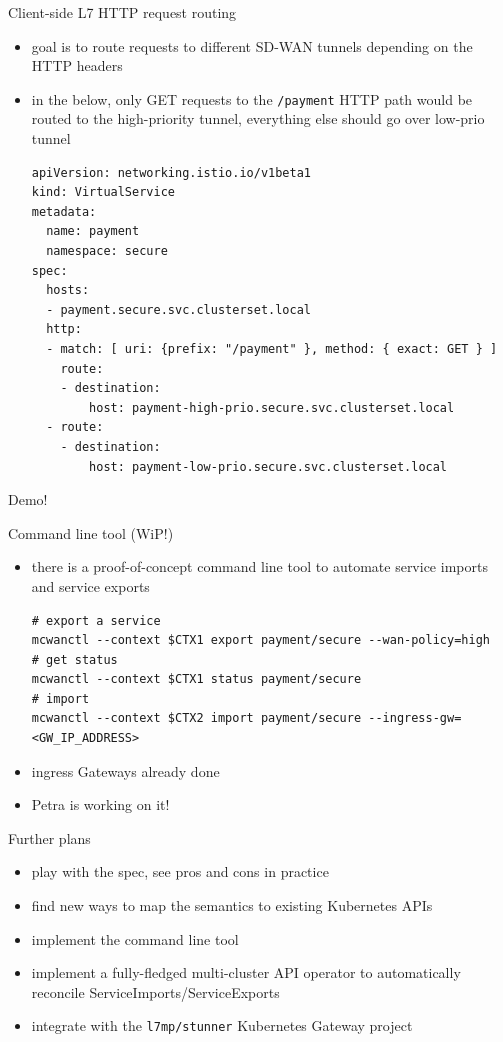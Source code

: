 \documentclass[presentation]{beamer}
\begin{document}
\begin{frame}[label={sec:org78a4d23},fragile]{Client-side L7 HTTP request routing}
 \begin{itemize}
\item goal is to route requests to different SD-WAN tunnels depending on the HTTP headers
\item in the below, only GET requests to the \texttt{/payment} HTTP path would be routed to the high-priority
tunnel, everything else should go over low-prio tunnel
\lstset{language=yaml,label= ,caption= ,captionpos=b,numbers=none}
\begin{lstlisting}
apiVersion: networking.istio.io/v1beta1
kind: VirtualService
metadata:
  name: payment
  namespace: secure
spec:
  hosts:
  - payment.secure.svc.clusterset.local
  http:
  - match: [ uri: {prefix: "/payment" }, method: { exact: GET } ]
    route:
    - destination:
        host: payment-high-prio.secure.svc.clusterset.local
  - route:
    - destination:
        host: payment-low-prio.secure.svc.clusterset.local
\end{lstlisting}
\end{itemize}
\end{frame}

\begin{frame}[label={sec:org6f16264}]{Demo!}
\end{frame}

\begin{frame}[label={sec:orgd2cbe97},fragile]{Command line tool (WiP!)}
 \begin{itemize}
\item there is a proof-of-concept command line tool to automate service imports and service exports
\lstset{language=sh,label= ,caption= ,captionpos=b,numbers=none}
\begin{lstlisting}
# export a service
mcwanctl --context $CTX1 export payment/secure --wan-policy=high
# get status
mcwanctl --context $CTX1 status payment/secure
# import 
mcwanctl --context $CTX2 import payment/secure --ingress-gw=<GW_IP_ADDRESS>
\end{lstlisting}
\item ingress Gateways already done
\item Petra is working on it!
\end{itemize}
\end{frame}

\begin{frame}[label={sec:org582e42f},fragile]{Further plans}
 \begin{itemize}
\item play with the \alert{\alert{spec}}, see pros and cons in practice
\item find new ways to \alert{\alert{map the semantics to existing Kubernetes APIs}}
\item implement the \alert{\alert{command line tool}}
\item implement a \alert{\alert{fully-fledged multi-cluster API operator}} to automatically reconcile
ServiceImports/ServiceExports
\item integrate with the \alert{\alert{\texttt{l7mp/stunner} Kubernetes Gateway project}}
\end{itemize}
\end{frame}
\end{document}
